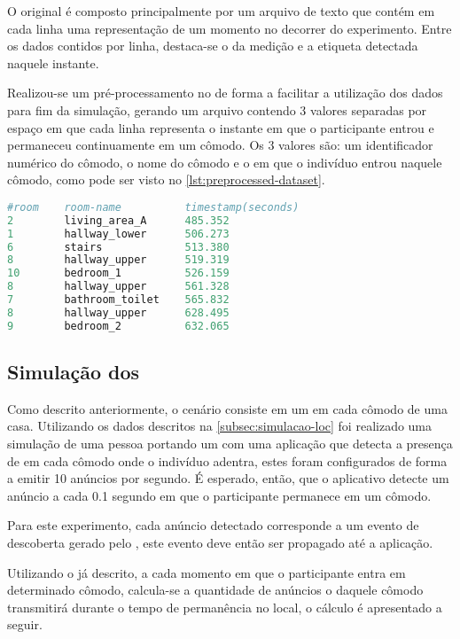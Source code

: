 O \dataset original é composto principalmente por um arquivo de texto que contém em cada linha uma representação de um momento no decorrer do experimento. Entre os dados contidos por linha, destaca-se o \timestamp da medição e a etiqueta detectada naquele instante. 

Realizou-se um pré-processamento no \dataset de forma a facilitar a utilização dos dados para fim da simulação, gerando um arquivo contendo 3 valores separadas por espaço em que cada linha representa o instante em que o participante entrou e permaneceu continuamente em um cômodo. Os 3 valores são: um identificador numérico do cômodo, o nome do cômodo e o \timestamp em que o indivíduo entrou naquele cômodo, como pode ser visto no \autoref{lst:preprocessed-dataset}.
\begin{lstlisting}[float=htb, language=python, caption={Parte do \dataset pré-processado}, label=lst:preprocessed-dataset]
#room    room-name          timestamp(seconds)
2        living_area_A      485.352
1        hallway_lower      506.273
6        stairs             513.380
8        hallway_upper      519.319
10       bedroom_1          526.159
8        hallway_upper      561.328
7        bathroom_toilet    565.832
8        hallway_upper      628.495
9        bedroom_2          632.065
\end{lstlisting}
	
\subsection{Simulação dos \beacons}

Como descrito anteriormente, o cenário consiste em um \beacon em cada cômodo de uma casa.
Utilizando os dados descritos na \autoref{subsec:simulacao-loc} foi realizado uma simulação de uma pessoa portando um \smartphone com uma aplicação \mhubcddl que detecta a presença de \beacons em cada cômodo onde o indivíduo adentra, estes \beacons foram configurados de forma a emitir 10 anúncios por segundo.  
É esperado, então,  que o aplicativo detecte um anúncio a cada 0.1 segundo em que o participante permanece em um cômodo. 

Para este experimento, cada anúncio detectado corresponde a um evento de descoberta gerado pelo \stwopa, este evento deve então ser propagado até a aplicação.

Utilizando o \dataset já descrito, a cada momento em que o participante entra em determinado cômodo, calcula-se a quantidade de anúncios o \beacon daquele cômodo transmitirá durante o tempo de permanência no local, o cálculo é apresentado a seguir.

